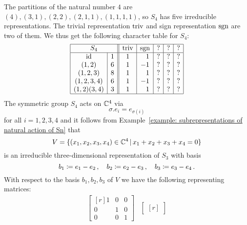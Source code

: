 \begin{example}
  The partitions of the natural number $4$ are $(4), (3,1), (2,2), (2,1,1), (1,1,1,1)$, so $S_4$ has five irreducible representations.
  The trivial representation $\operatorname{triv}$ and sign representation $\operatorname{sgn}$ are two of them.
  We thus get the following character table for $S_4$:
  \[
    \begin{array}{|c|c||c|c|c|c|c|}
      \hline
        \multicolumn{2}{|c||}{S_4}
      & \triv
      & \sgn
      & ?
      & ?
      & ?
      \\
      \hline
        \id
      & 1
      &            1
      & \phantom{-}1
      &            ?
      &            ?
      &            ?
      \\
        (1,2)
      & 6
      &            1
      &           -1
      &            ?
      &            ?
      &            ?
      \\
        (1,2,3)
      & 8
      &            1
      & \phantom{-}1
      &            ?
      &            ?
      &            ?
      \\
        (1,2,3,4)
      & 6
      &            1
      &           -1
      &            ?
      &            ?
      &            ?
      \\
        (1,2)(3,4)
      & 3
      &            1
      & \phantom{-}1
      &            ?
      &            ?
      &            ?
      \\
      \hline
    \end{array}
  \]
  The symmetric group $S_4$ acts on $\mathbb{C}^4$ via
  \[
      \sigma.e_i
    = e_{\sigma(i)}
  \]
  for all $i = 1, 2, 3, 4$ and it follows from Example~\ref{example: subrepresentations of natural action of Sn} that
  \[
      V
    = \{
        (x_1, x_2, x_3, x_4) \in \Complex^4
      \suchthat
        x_1 + x_2 + x_3 + x_4 = 0
      \}
  \]
  is an irreducible three-dimensional representation of $S_3$ with basis
  \[
    b_1 \coloneqq e_1 - e_2 \,,
    \quad
    b_2 \coloneqq e_2 - e_3 \,,
    \quad
    b_3 \coloneqq e_3 - e_4 \,.
  \]
  With respect to the basis $b_1, b_2, b_3$ of $V$ we have the following representing matrices:
  \[
    \begin{array}{ccccc}
        \begin{bmatrix*}[r]
          1 & 0 & 0 \\
          0 & 1 & 0 \\
          0 & 0 & 1
        \end{bmatrix*}
      & \begin{bmatrix*}[r]

\end{bmatrix*}
\end{array}\]
\end{example}
